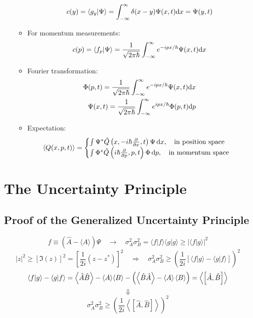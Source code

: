 \begin{enumerate}
\begin{itemize}
		\[c(y)=\left\langle g_y|\Psi\right\rangle  = \int_{-\infty}^\infty\delta(x-y)\Psi(x,t){\rm d}x = \Psi(y,t)\]
		\item For momentum measurements:\[
		c(p) = \left\langle f_p|\Psi\right\rangle =  \frac{1}{\sqrt{2\pi\hbar}}
		\int_{-\infty}^\infty e^{-ipx/\hbar}\Psi(x,t){\rm d}x\]
		\item Fourier transformation:\[\begin{aligned}
			\Phi(p,t) = \frac{1}{\sqrt{2\pi\hbar}}\int_{-\infty}^\infty e^{-ipx/\hbar}\Psi(x,t){\rm d}x \\
			\Psi(x,t) = \frac{1}{\sqrt{2\pi\hbar}}\int_{-\infty}^\infty e^{ipx/\hbar}\Phi(p,t){\rm d}p \\
		\end{aligned}\]
		\item Expectation: \begin{equation*}
			\left\langle Q(x,p,t)\right\rangle = \begin{cases}
				\int \Psi^*\hat{Q}\left(x,-i\hbar\frac{\partial}{\partial x},t\right)\Psi\,{\rm d}x,\quad \text{in position space}  \\
				\int \Phi^*\hat{Q}\left(i\hbar\frac{\partial}{\partial p},p,t\right) \Phi \,{\rm d}p,\quad \text{in momentum space}
			\end{cases}
		\end{equation*}
	\end{itemize}
\end{enumerate}

\section{The Uncertainty Principle}
\subsection{Proof of the Generalized Uncertainty Principle}
\[ f\equiv\left(\hat{A}-\langle A\rangle\right)\Psi \quad\rightarrow\quad 
\sigma_A^2\sigma_B^2=\langle f|f\rangle\langle g|g\rangle\geq|\langle f| g\rangle|^2
\]
\[ |z|^2\geq[\Im(z)]^2=\left[\frac{1}{2i}(z-z^*)\right] ^2 \quad\Rightarrow\quad
\sigma_A^2\sigma_B^2\geq\left(\frac{1}{2i}\left[
\langle f| g\rangle -\langle g|f \rangle
\right] \right)^2      
\]
\[\langle f| g\rangle - \braket{g}{f}
=\expval{\hat{A}\hat{B}}-\langle A\rangle\langle B\rangle
- \qty(\expval{\hat{B}\hat{A}} - \expval{A}\expval{B})=\expval{\qty[\hat{A},\hat{B}]}\]
\[\Downarrow\]
$${ \boxed{\sigma_A^2\sigma_B^2\geq \left(\frac{1}{2i}\left\langle \left[\hat{A},\hat{B}\right] \right\rangle \right)^2  } }$$


